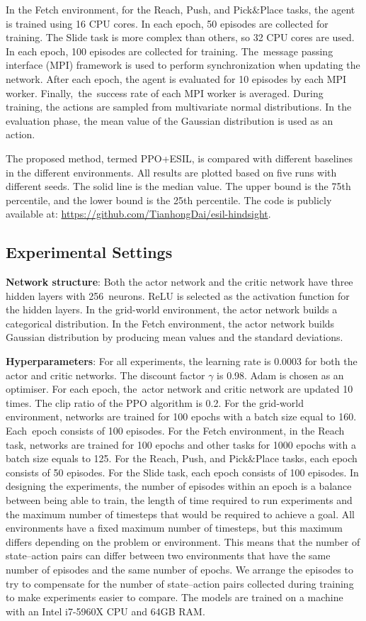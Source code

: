 In the Fetch environment, for the Reach, Push, and Pick$\&$Place tasks, the agent is trained using 16 CPU cores. In each epoch, 50 episodes are collected for training. The Slide task is more complex than others, so 32 CPU cores are used. In each epoch, 100 episodes are collected for training. The~{message passing interface (MPI) framework is used to perform} synchronization when updating the network. After each epoch, the agent is evaluated for 10 episodes by each MPI worker. Finally,~the~success rate of each MPI worker is averaged. During training, the actions are sampled from {multivariate normal} distributions. In the evaluation phase, the mean value of the Gaussian distribution is used as an action. 

The proposed method, termed PPO+ESIL, is compared with different baselines in the different environments. All results are plotted based on five runs with different seeds. The solid line is the median value. The upper bound is the {75th} percentile, and the lower bound is the {25th} percentile. The code is publicly available at: \url{https://github.com/TianhongDai/esil-hindsight}.

\subsection{Experimental Settings}
\textbf{Network structure}: Both the actor network and the critic network have three hidden layers with 256~neurons. ReLU is selected as the activation function for the hidden layers. In the grid-world environment, the actor network builds a categorical distribution. In the Fetch environment, the actor network builds Gaussian {distribution by producing mean values and the standard deviations}.

\textbf{Hyperparameters}: For all experiments, the learning rate is 0.0003 for both the actor and critic networks. The discount factor $\gamma$ is 0.98. Adam is chosen as an optimiser. For each epoch, the~actor network and critic network are updated 10 times. The clip ratio of the PPO algorithm is 0.2. For the grid-world environment, networks are trained for 100 epochs with a batch size equal to 160. Each~epoch consists of 100 episodes. For the Fetch environment, in the Reach task, networks are trained for 100 epochs and other tasks for 1000 epochs with a batch size equals to 125. For the Reach, Push, and Pick$\&$Place tasks, each epoch consists of 50 episodes. For the Slide task, each epoch consists of 100 episodes. In designing the experiments, the number of episodes within an epoch is a balance between being able to train, the length of time required to run experiments and the maximum number of timesteps that would be required to achieve a goal. All environments have a fixed maximum number of timesteps, but this maximum differs depending on the problem or environment. This means that the number of state--action pairs can differ between two environments that have the same number of episodes and the same number of epochs. We arrange the episodes to try to compensate for the number of state--action pairs collected during training to make experiments easier to compare. The models are trained on a machine with an Intel i7-5960X CPU and 64GB RAM.

